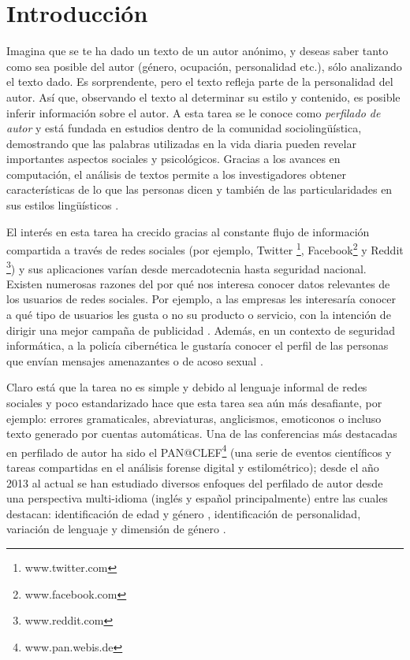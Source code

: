 \chapter{Introducción}

Imagina que se te ha dado un texto de un autor anónimo, y deseas saber tanto como sea posible del autor (género, ocupación, personalidad etc.), sólo analizando el texto dado. Es sorprendente, pero el texto refleja parte de la personalidad del autor. Así que, observando el texto al determinar su estilo y contenido, es posible inferir información sobre el autor. A esta tarea se le conoce como \textit{perfilado de autor} y está fundada en estudios dentro de la comunidad sociolingüística, demostrando que las palabras utilizadas en la vida diaria pueden revelar importantes aspectos sociales y psicológicos. Gracias a los avances en computación, el análisis de textos permite a los investigadores obtener características de lo que las personas dicen y también de las particularidades en sus estilos lingüísticos \citep{Pennebaker2002}. 

El interés en esta tarea ha crecido gracias al constante flujo de información compartida a través de redes sociales (por ejemplo, Twitter \footnote{www.twitter.com}, Facebook\footnote{www.facebook.com} y Reddit \footnote{www.reddit.com}) y sus aplicaciones varían desde mercadotecnia hasta seguridad nacional. 
Existen numerosas razones del por qué nos interesa conocer datos relevantes de los usuarios de redes sociales. Por ejemplo, a las empresas les interesaría conocer a qué tipo de usuarios les gusta o no su producto o servicio, con la intención de dirigir una mejor campaña de publicidad \citep{ikeda2013twitter}. Además, en un contexto de seguridad informática, a la policía cibernética le gustaría conocer el perfil de las personas que envían mensajes amenazantes o de acoso sexual \citep{bogdanova2012impact}.

Claro está que la tarea no es simple y debido al lenguaje informal de redes sociales y poco estandarizado hace que esta tarea sea aún más desafiante, por ejemplo: errores gramaticales, abreviaturas, anglicismos, emoticonos o incluso texto generado por cuentas automáticas. Una de las conferencias más destacadas en perfilado de autor ha sido el PAN@CLEF\footnote{www.pan.webis.de} (una serie de eventos científicos y tareas compartidas en el análisis forense digital y estilométrico); desde el año 2013 al actual se han estudiado diversos enfoques del perfilado de autor desde una perspectiva multi-idioma (inglés y español principalmente) entre las cuales destacan: identificación de edad y género \citep{Rangel2013b}, identificación de personalidad, variación de lenguaje y dimensión de género \citep{Stammatatos2015}. 

